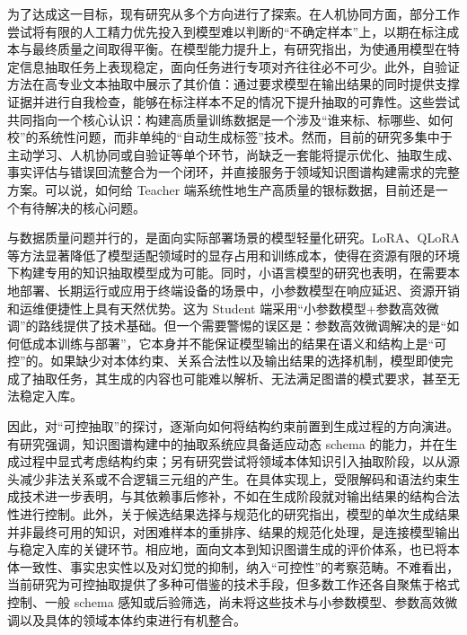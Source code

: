 为了达成这一目标，现有研究从多个方向进行了探索。在人机协同方面，部分工作尝试将有限的人工精力优先投入到模型难以判断的“不确定样本”上，以期在标注成本与最终质量之间取得平衡\cite{Barbosa2025HILTS}。在模型能力提升上，有研究指出，为使通用模型在特定信息抽取任务上表现稳定，面向任务进行专项对齐往往必不可少\cite{Qi2024ADELIE}。此外，自验证方法在高专业文本抽取中展示了其价值：通过要求模型在输出结果的同时提供支撑证据并进行自我检查，能够在标注样本不足的情况下提升抽取的可靠性\cite{Gero2023SelfVerificationClinicalIE}。这些尝试共同指向一个核心认识：构建高质量训练数据是一个涉及“谁来标、标哪些、如何校”的系统性问题，而非单纯的“自动生成标签”技术。然而，目前的研究多集中于主动学习、人机协同或自验证等单个环节，尚缺乏一套能将提示优化、抽取生成、事实评估与错误回流整合为一个闭环，并直接服务于领域知识图谱构建需求的完整方案。可以说，如何给 Teacher 端系统性地生产高质量的银标数据，目前还是一个有待解决的核心问题。

与数据质量问题并行的，是面向实际部署场景的模型轻量化研究。LoRA、QLoRA 等方法显著降低了模型适配领域时的显存占用和训练成本\cite{Hu2022LoRA,Dettmers2023QLoRA,Han2024PEFTSurvey}，使得在资源有限的环境下构建专用的知识抽取模型成为可能。同时，小语言模型的研究也表明，在需要本地部署、长期运行或应用于终端设备的场景中，小参数模型在响应延迟、资源开销和运维便捷性上具有天然优势\cite{Lu2024SmallLanguageModels}。这为 Student 端采用“小参数模型+参数高效微调”的路线提供了技术基础。但一个需要警惕的误区是：参数高效微调解决的是“如何低成本训练与部署”，它本身并不能保证模型输出的结果在语义和结构上是“可控”的。如果缺少对本体约束、关系合法性以及输出结果的选择机制，模型即使完成了抽取任务，其生成的内容也可能难以解析、无法满足图谱的模式要求，甚至无法稳定入库。

因此，对“可控抽取”的探讨，逐渐向如何将结构约束前置到生成过程的方向演进。有研究强调，知识图谱构建中的抽取系统应具备适应动态 schema 的能力，并在生成过程中显式考虑结构约束\cite{Ye2023SchemaAdaptableKGC}；另有研究尝试将领域本体知识引入抽取阶段，以从源头减少非法关系或不合逻辑三元组的产生\cite{vanCauter2024OntologyGuidedKGC}。在具体实现上，受限解码和语法约束生成技术进一步表明，与其依赖事后修补，不如在生成阶段就对输出结果的结构合法性进行控制\cite{Hemmer2023LazyKDecoding,Geng2023GrammarConstrainedDecoding}。此外，关于候选结果选择与规范化的研究指出，模型的单次生成结果并非最终可用的知识，对困难样本的重排序、结果的规范化处理，是连接模型输出与稳定入库的关键环节\cite{Ma2023LLMNotGoodFewShotIE,Zhang2024EDC}。相应地，面向文本到知识图谱生成的评价体系，也已将本体一致性、事实忠实性以及对幻觉的抑制，纳入“可控性”的考察范畴\cite{Mihindukulasooriya2023Text2KGBench}。不难看出，当前研究为可控抽取提供了多种可借鉴的技术手段，但多数工作还各自聚焦于格式控制、一般 schema 感知或后验筛选，尚未将这些技术与小参数模型、参数高效微调以及具体的领域本体约束进行有机整合。

